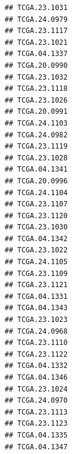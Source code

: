 \documentclass[UTF8]{beamer}\usepackage[]{graphicx}\usepackage[]{color}
\makeatletter
\newenvironment{kframe}{%
 \def\at@end@of@kframe{}%
 \ifinner\ifhmode%
  \def\at@end@of@kframe{\end{minipage}}%
  \begin{minipage}{\columnwidth}%
 \fi\fi%
 \def\FrameCommand##1{\hskip\@totalleftmargin \hskip-\fboxsep
 \colorbox{shadecolor}{##1}\hskip-\fboxsep
     \hskip-\linewidth \hskip-\@totalleftmargin \hskip\columnwidth}%
 \MakeFramed {\advance\hsize-\width
   \@totalleftmargin\z@ \linewidth\hsize
   \@setminipage}}%
 {\par\unskip\endMakeFramed%
 \at@end@of@kframe}
\newenvironment{knitrout}{}{} %
\makeatother
\begin{document}
\begin{frame}[fragile]
\begin{knitrout}
\begin{kframe}
\begin{verbatim}
## TCGA.23.1031                                                    
## TCGA.24.0979                                                    
## TCGA.23.1117                                                    
## TCGA.23.1021                                                    
## TCGA.04.1337                                                    
## TCGA.20.0990                                                    
## TCGA.23.1032                                                    
## TCGA.23.1118                                                    
## TCGA.23.1026                                                    
## TCGA.20.0991                                                    
## TCGA.24.1103                                                    
## TCGA.24.0982                                                    
## TCGA.23.1119                                                    
## TCGA.23.1028                                                    
## TCGA.04.1341                                                    
## TCGA.20.0996                                                    
## TCGA.24.1104                                                    
## TCGA.23.1107                                                    
## TCGA.23.1120                                                    
## TCGA.23.1030                                                    
## TCGA.04.1342                                                    
## TCGA.23.1022                                                    
## TCGA.24.1105                                                    
## TCGA.23.1109                                                    
## TCGA.23.1121                                                    
## TCGA.04.1331                                                    
## TCGA.04.1343                                                    
## TCGA.23.1023                                                    
## TCGA.24.0968                                                    
## TCGA.23.1110                                                    
## TCGA.23.1122                                                    
## TCGA.04.1332                                                    
## TCGA.04.1346                                                    
## TCGA.23.1024                                                    
## TCGA.24.0970                                                    
## TCGA.23.1113                                                    
## TCGA.23.1123                                                    
## TCGA.04.1335                                                    
## TCGA.04.1347                                                    

\end{verbatim}
\end{kframe}
\end{knitrout}
\end{frame}
\end{document}
